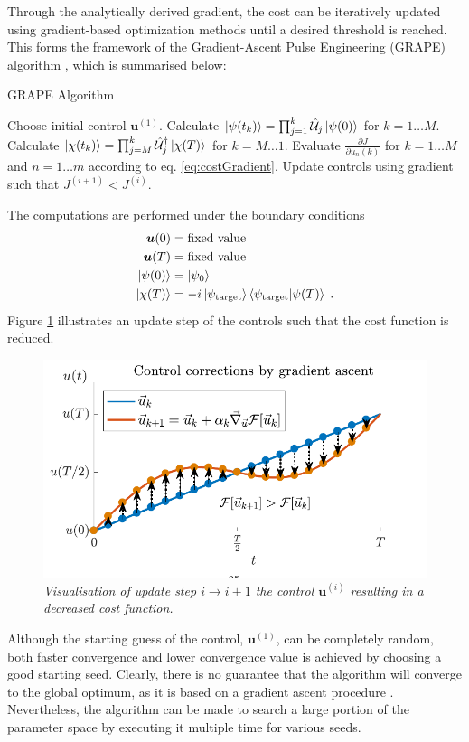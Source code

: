 Through the analytically derived gradient, the cost can be iteratively updated using gradient-based optimization methods until a desired threshold is reached. This forms the framework of the Gradient-Ascent Pulse Engineering (GRAPE) algorithm \cite{Khaneja2005}, which is summarised below:

\begin{algorithm}
\begin{algorithmic}
\caption{GRAPE Algorithm}
\State Choose initial control $\boldsymbol{u}^{(1)}$.
	\State Calculate $\ket{\psi (t_k)} = \prod_{j=1}^{k} \hat{\mathcal{U}}_j \ket{\psi (0)}$ for $k = 1 \ldots M$.
	\State Calculate $\ket{\chi (t_k)} = \prod_{j=M}^{k} \hat{\mathcal{U}}_{j}^{\dag} \ket{\chi (T)}$ for $k = M \ldots 1$. 
	\State Evaluate $\frac{\partial J}{\partial u_n (k)}$ for $k = 1 \ldots M$ and $n = 1 \ldots m$ according to eq. \eqref{eq:costGradient}.
	\State Update controls using gradient such that $J^{(i + 1)} < J^{(i)}$. 
\EndWhile
\end{algorithmic}
\end{algorithm}
The computations are performed under the boundary conditions
\begin{align}
	\boldsymbol{u}(0) &= \text{fixed value} \label{eq:firstBound} \\
	\boldsymbol{u}(T) &= \text{fixed value} \\
	\ket{\psi (0)} &= \ket{\psi_0} \\
	\ket{\chi (T)} &= -i \ket{\psi_{\mathrm{target}}} \braket{\psi_{\mathrm{target}} | \psi (T)} \; .  \label{eq:lastBound}
\end{align}
Figure \ref{fig:ControlUpdate} illustrates an update step of the controls such that the cost function is reduced.
\begin{figure}[!h]
	\centering
	\includegraphics[width=0.7\columnwidth]{Figures/ControlUpdate.pdf} 
	\caption{ \textit{Visualisation of update step $i \to i+1$ the control $\boldsymbol{u}^{(i)}$ resulting in a decreased cost function.}}
	\label{fig:ControlUpdate} 
\end{figure} 
Although the starting guess of the control, $\boldsymbol{u}^{(1)}$, can be completely random, both faster convergence and lower convergence value is achieved by choosing a good starting seed. Clearly, there is no guarantee that the algorithm will converge to the global optimum, as it is based on a gradient ascent procedure \cite{Khaneja2005}. Nevertheless, the algorithm can be made to search a large portion of the parameter space by executing it multiple time for various seeds.  


